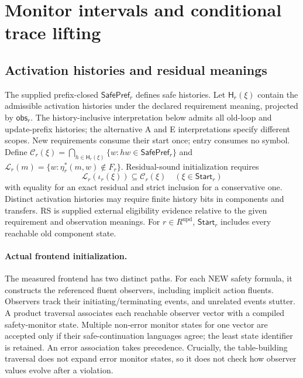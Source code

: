 \documentclass[11pt]{article}
\begin{document}
\section{Monitor intervals and conditional trace lifting}
\label{supp:runtime}
\subsection{Activation histories and residual meanings}
The supplied prefix-closed $\mathsf{SafePref}_r$ defines safe histories. Let $\mathsf H_r(\xi)$ contain the admissible activation histories under the declared requirement meaning, projected by $\mathsf{obs}_r$. The history-inclusive interpretation below admits all old-loop and update-prefix histories; the alternative A and E interpretations specify different scopes. New requirements consume their start once; entry consumes no symbol. Define $\mathcal C_r(\xi)=\bigcap_{h\in\mathsf H_r(\xi)}\{w:hw\in\mathsf{SafePref}_r\}$ and $\mathcal L_r(m)=\{w:\eta_r^*(m,w)\notin F_r\}$. Residual-sound initialization requires
  \[
    \mathcal L_r(\iota_r(\xi))\subseteq\mathcal C_r(\xi)
    \quad(\xi\in\mathsf{Start}_r)
    \tag{RS}
  \]
with equality for an exact residual and strict inclusion for a conservative one. Distinct activation histories may require finite history bits in components and transfers. RS is supplied external eligibility evidence relative to the given requirement and observation meanings. For $r\in R^{\mathrm{upd}}$, $\mathsf{Start}_r$ includes every reachable old component state.


\paragraph{Actual frontend initialization.}
The measured frontend has two distinct paths. For each NEW safety formula, it constructs the referenced fluent observers, including implicit action fluents. Observers track their initiating/terminating events, and unrelated events stutter. A product traversal associates each reachable observer vector with a compiled safety-monitor state. Multiple non-error monitor states for one vector are accepted only if their safe-continuation languages agree; the least state identifier is retained. An error association takes precedence. Crucially, the table-building traversal does not expand error monitor states, so it does not check how observer values evolve after a violation.
\end{document}
